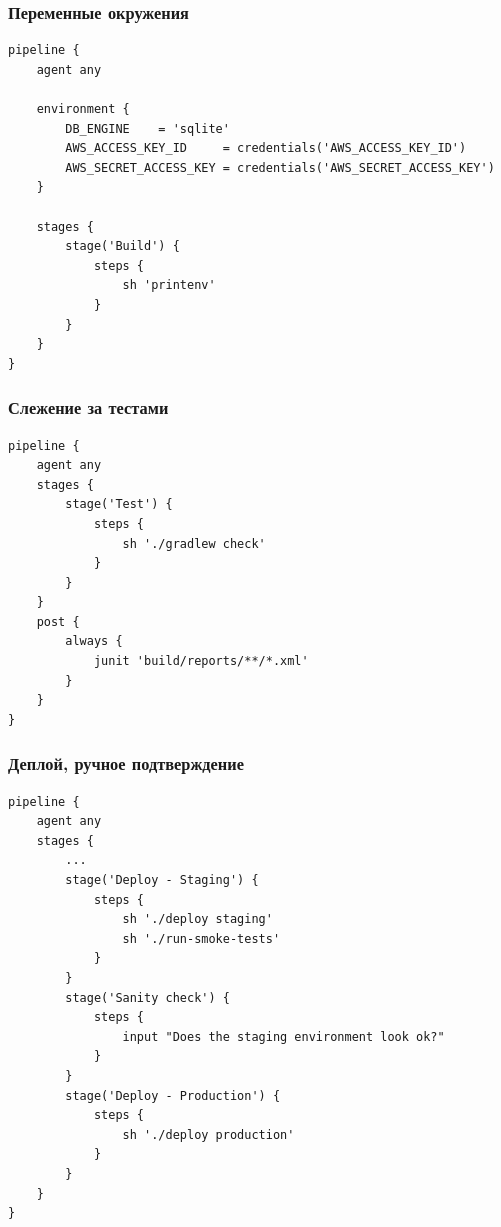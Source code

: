\documentclass{../../slides-style}
\begin{document}
    \begin{frame}[fragile]
        \frametitle{Переменные окружения}
        \begin{footnotesize}
            \begin{verbatim}
pipeline {
    agent any

    environment {
        DB_ENGINE    = 'sqlite'
        AWS_ACCESS_KEY_ID     = credentials('AWS_ACCESS_KEY_ID')
        AWS_SECRET_ACCESS_KEY = credentials('AWS_SECRET_ACCESS_KEY')
    }

    stages {
        stage('Build') {
            steps {
                sh 'printenv'
            }
        }
    }
}
            \end{verbatim}
        \end{footnotesize}
    \end{frame}

    \begin{frame}[fragile]
        \frametitle{Слежение за тестами}
        \begin{verbatim}
pipeline {
    agent any
    stages {
        stage('Test') {
            steps {
                sh './gradlew check'
            }
        }
    }
    post {
        always {
            junit 'build/reports/**/*.xml'
        }
    }
}
        \end{verbatim}
    \end{frame}

    \begin{frame}[fragile]
        \frametitle{Деплой, ручное подтверждение}
        \begin{scriptsize}
            \begin{verbatim}
pipeline {
    agent any
    stages {
        ...
        stage('Deploy - Staging') {
            steps {
                sh './deploy staging'
                sh './run-smoke-tests'
            }
        }
        stage('Sanity check') {
            steps {
                input "Does the staging environment look ok?"
            }
        }
        stage('Deploy - Production') {
            steps {
                sh './deploy production'
            }
        }
    }
}
            \end{verbatim}
        \end{scriptsize}
    \end{frame}
\end{document}
